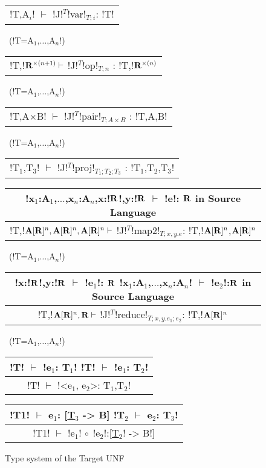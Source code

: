 \begin{figure*}[tb]
    \centering
    \begin{tabular}{c} 
        \\\hline
        !T,A$_i$! $\vdash$ !J!$^T$!var!$_{T;i}$: !T!
        \end{tabular}~(!T=A$_1$,$\ldots$,A$_n$!)
        \hspace{0.5cm}
        \begin{tabular}{c}
            \\\hline
            !T,!$\mathbf{R}^{\times(n+1)} \vdash$ !J!$^T$!op!$_{T;n}$ : !T,!$\mathbf{R}^{\times(n)}$
        \end{tabular}~(!T=A$_1$,$\ldots$,A$_n$!)
    
        \begin{tabular}{c}
            \\\hline
            !T,A$\times$B! $\vdash$ !J!$^T$!pair!$_{T;A\times B}$ : !T,A,B!
        \end{tabular}~(!T=A$_1$,$\ldots$,A$_n$!)
    
        \begin{tabular}{c}
            \\\hline
            !T$_1$,T$_3$! $\vdash$ !J!$^T$!proj!$_{T_1;T_2;T_3}$ : !T$_1$,T$_2$,T$_3$!
        \end{tabular}
    
        \begin{tabular}{c}
            !x$_1$:A$_1$,$\ldots$,x$_n$:A$_n$,x:!$\mathbf{R}$!,y:!$\mathbf{R}$ $\vdash$ !e!: $\mathbf{R}$ \quad in Source Language
            \\\hline  
            !T,!$\mathbf{A}[\mathbf{R}]^{n},\mathbf{A}[\mathbf{R}]^{n},\mathbf{A}[\mathbf{R}]^{n} \vdash$ !J!$^T$!map2!$_{T; x,y.e}$: !T,!$\mathbf{A}[\mathbf{R}]^{n}$,$\mathbf{A}[\mathbf{R}]^{n}$
        \end{tabular}~(!T=A$_1$,$\ldots$,A$_n$!)
    
        \begin{tabular}{c}
            !x:!$\mathbf{R}$!,y:!$\mathbf{R}$ $\vdash$ !e$_1$!: $\mathbf{R}$ \quad !x$_1$:A$_1$,$\ldots$,x$_n$:A$_n$! $\vdash$ !e$_2$!:$\mathbf{R}$ \quad in Source Language
            \\\hline  
            !T,!$\mathbf{A}[\mathbf{R}]^{n},\mathbf{R} \vdash$ !J!$^T$!reduce!$_{T; x,y.e_1; e_2}$: !T,!$\mathbf{A}[\mathbf{R}]^{n}$
        \end{tabular}~(!T=A$_1$,$\ldots$,A$_n$!)

        \begin{tabular}{c}
            !T! $\vdash$ !e$_1$: T$_1$!  \quad !T! $\vdash$ !e$_1$: T$_2$!
            \\ \hline
            !T! $\vdash$ !<e$_1$, e$_2$>: T$_1$,T$_2$!
        \end{tabular}
        \hspace{0.5cm}
        \begin{tabular}{c}
            !T1! $\vdash$ e$_1$: [\underline{T$_3$} -> B]  \quad !T$_2$ $\vdash$ e$_2$: T$_3$! 
            \\ \hline
            !T1! $\vdash$ !e$_1$! $\circ$ !e$_2$!:[\underline{T$_2$}! -> B!]
        \end{tabular}

    \vspace{-0.2cm}
    \caption{Type system of the Target UNF}
    \vspace{-0.4cm}
    \label{fig:target_unf_typesystem}
    \end{figure*}